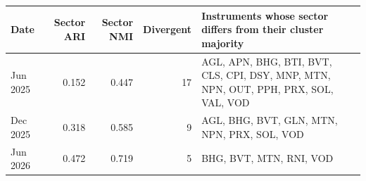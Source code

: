 \begin{tabularx}{\linewidth}{@{}l r r r >{\raggedright\arraybackslash}X@{}}
\toprule
Date & Sector ARI & Sector NMI & Divergent & Instruments whose sector differs from their cluster majority \\
\midrule
Jun 2025 & 0.152 & 0.447 & 17 & AGL, APN, BHG, BTI, BVT, CLS, CPI, DSY, MNP, MTN, NPN, OUT, PPH, PRX, SOL, VAL, VOD \\
Dec 2025 & 0.318 & 0.585 & 9 & AGL, BHG, BVT, GLN, MTN, NPN, PRX, SOL, VOD \\
Jun 2026 & 0.472 & 0.719 & 5 & BHG, BVT, MTN, RNI, VOD \\
\bottomrule
\end{tabularx}
